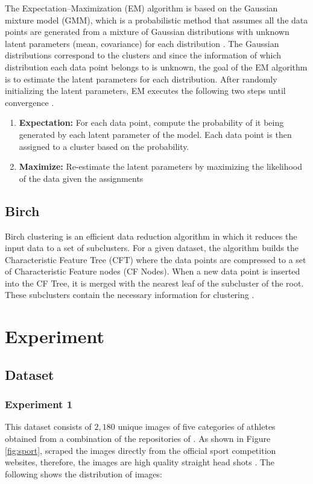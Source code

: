 \documentclass[12pt,english]{article}
\begin{document}
The Expectation–Maximization (EM) algorithm is based on the Gaussian mixture model (GMM), which is a probabilistic method that assumes all the data points are generated from a mixture of Gaussian distributions with unknown latent parameters (mean, covariance) for each distribution \cite{scikit-learn}. The Gaussian distributions correspond to the clusters and since the information of which distribution each data point belongs to is unknown, the goal of the EM algorithm is to estimate the latent parameters for each distribution. After randomly initializing the latent parameters, EM executes the following two steps until convergence \cite{scikit-learn}.

\begin{enumerate}
\item \textbf{Expectation: } For each data point, compute the probability of it being generated by each latent parameter of the model. Each data point is then assigned to a cluster based on the probability.

\item \textbf{Maximize: } Re-estimate the latent parameters by maximizing the likelihood of the data given the assignments 

\end{enumerate}

\subsection{Birch}
\quad
Birch clustering is an efficient data reduction algorithm in which it reduces the input data to a set of subclusters. For a given dataset, the algorithm builds the Characteristic Feature Tree (CFT) where the data points are compressed to a set of  Characteristic Feature nodes (CF Nodes). When a new data point is inserted into the CF Tree, it is merged with the nearest leaf of the subcluster of the root. These subclusters contain the necessary information for clustering \cite{scikit-learn}.

\section{Experiment}
\label{experiment}

\subsection{Dataset}

\subsubsection{Experiment 1}
\label{experiment1}
\quad
This dataset consists of $2,180$ unique images of five categories of athletes obtained from a combination of the repositories of \cite{data1}. As shown in Figure \ref{fig:sport}, \cite{data1} scraped the images directly from the official sport competition websites, therefore, the images are high quality straight head shots \cite{data1}. The following shows the distribution of images:
\end{document}
